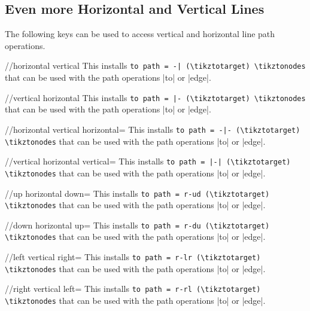 \subsection{Even more Horizontal and Vertical Lines}

The following keys can be used to access vertical and horizontal line path operations.
\begin{stylekey}{/\tikzext/horizontal vertical}
  This installs  \verb!to path = -| (\tikztotarget) \tikztonodes!
  that can be used with the path operations |to| or |edge|.
\end{stylekey}
\begin{stylekey}{/\tikzext/vertical horizontal}
  This installs \verb!to path = |- (\tikztotarget) \tikztonodes!
  that can be used with the path operations |to| or |edge|.
\end{stylekey}
\begin{stylekey}{/\tikzext/horizontal vertical horizontal=}
  This installs  \verb!to path = -|- (\tikztotarget) \tikztonodes!
  that can be used with the path operations |to| or |edge|.
\end{stylekey}
\begin{stylekey}{/\tikzext/vertical horizontal vertical=}
  This installs  \verb!to path = |-| (\tikztotarget) \tikztonodes!
  that can be used with the path operations |to| or |edge|.
\end{stylekey}
\begin{stylekey}{/\tikzext/up horizontal down=}
  This installs  \verb!to path = r-ud (\tikztotarget) \tikztonodes!
  that can be used with the path operations |to| or |edge|.
\end{stylekey}
\begin{stylekey}{/\tikzext/down horizontal up=}
  This installs  \verb!to path = r-du (\tikztotarget) \tikztonodes!
  that can be used with the path operations |to| or |edge|.
\end{stylekey}
\begin{stylekey}{/\tikzext/left vertical right=}
  This installs  \verb!to path = r-lr (\tikztotarget) \tikztonodes!
  that can be used with the path operations |to| or |edge|.
\end{stylekey}
\begin{stylekey}{/\tikzext/right vertical left=}
  This installs  \verb!to path = r-rl (\tikztotarget) \tikztonodes!
  that can be used with the path operations |to| or |edge|.
\end{stylekey}
